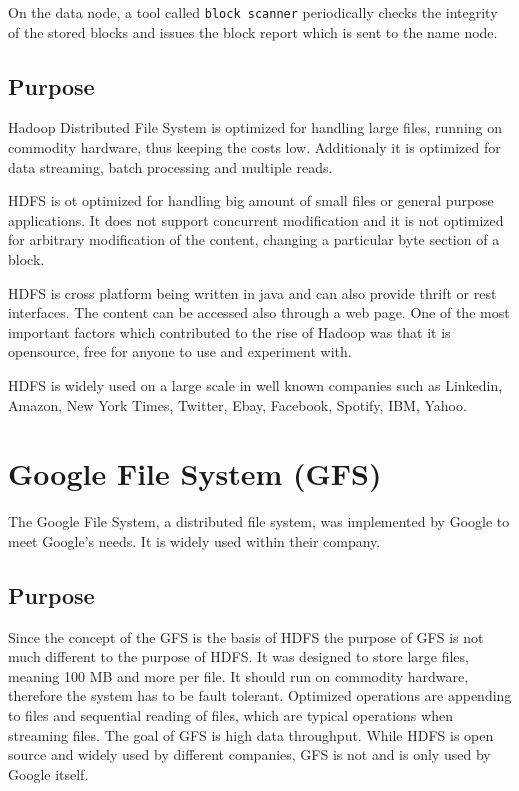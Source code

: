 \documentclass{sig-alternate}
\begin{document}
On the data node, a tool called \texttt{block scanner} periodically checks the integrity of the stored blocks and issues the block report which is sent to the name node.

\subsection{Purpose}
Hadoop Distributed File System is optimized for
handling large files, running on commodity hardware, thus keeping the costs low.
Additionaly it is optimized for data streaming, batch processing
and multiple reads.

HDFS is ot optimized for handling
big amount of small files or general purpose applications.
It does not support concurrent modification and it is not optimized for arbitrary modification of the content, changing a particular byte section of a block.

HDFS is cross platform being written in java and can also provide thrift or rest interfaces. The content can be accessed also through a web page. One of the most important factors which contributed to the rise of Hadoop was that it is 
opensource, free for anyone to use and experiment with.

HDFS is widely used on a large scale in well known companies such as  Linkedin, Amazon, New York Times, Twitter, Ebay, Facebook, Spotify, IBM, Yahoo.


\section{Google File System (GFS)}
The Google File System, a distributed file system, was implemented by Google to meet Google's needs. It is widely used within their company.
\subsection{Purpose}
Since the concept of the GFS is the basis of HDFS the purpose of GFS is not much different to the purpose of HDFS. It was designed to store large files, meaning 100 MB and more per file. It should run on commodity hardware, therefore the system has to be fault tolerant. Optimized operations are appending to files and sequential reading of files, which are typical operations when streaming files. The goal of GFS is high data throughput.
While HDFS is open source and widely used by different companies, GFS is not and is only used by Google itself.
\end{document}
